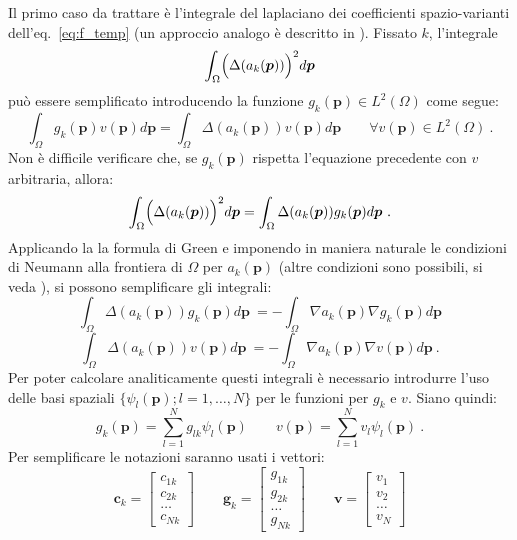 \documentclass[a4paper,11pt,twoside,openright]{book}							%
\begin{document}
Il primo caso da trattare è l'integrale del laplaciano dei coefficienti spazio-varianti dell'eq.~\eqref{eq:f_temp} (un approccio analogo è descritto in \cite{art:sangalli}). Fissato $k$, l'integrale
\begin{equation}
\int_{\Omega} \Bigl( \Delta(  a_k(\bm p)  ) \Bigr)^2 d \bm p
\label{eq:formadoppia}
\end{equation}
può essere semplificato introducendo la funzione $g_k(\bm p) \in L^2(\Omega)$ come segue:
\begin{equation}
\label{eq:ps1}
\int_\Omega g_k(\bm{p}) v(\bm{p}) d \bm{p}= \int_\Omega \Delta (a_k(\bm p)) v(\bm p) d \bm{p}\qquad \forall v(\bm{p}) \in L^2(\Omega) \ .
\end{equation}
Non è difficile verificare che, se $g_k(\bm p)$ rispetta l'equazione precedente con $v$ arbitraria, allora:
\begin{equation}
\label{eq:ps2}
\int_{\Omega} \Bigl( \Delta(  a_k(\bm p)  ) \Bigr)^2 d \bm p = \int_{\Omega}  \Delta(  a_k(\bm p))g_k(\bm p)d \bm p \ .
\end{equation}
Applicando la la formula di Green e imponendo in maniera naturale le condizioni di Neumann alla frontiera di $\Omega$ per $a_k(\bm p)$ (altre condizioni sono possibili, si veda \cite{art:sangalli}), si possono semplificare gli integrali:
\begin{equation}
\int_{\Omega}  \Delta(  a_k(\bm p))g_k(\bm p)d \bm p \ = -\int_{\Omega} \nabla  a_k(\bm p)\nabla g_k(\bm p)d \bm p
\label{eq:formasing1}
\end{equation}
\begin{equation}
\int_{\Omega}  \Delta(  a_k(\bm p))v(\bm p)d \bm p \ = -\int_{\Omega} \nabla  a_k(\bm p)\nabla v(\bm p)d \bm p \ .
\label{eq:formasing2}
\end{equation}
Per poter calcolare analiticamente questi integrali è necessario introdurre l'uso delle basi spaziali $\{ \psi_l(\bm p);l=1, \ldots , N \}$ per le funzioni per $g_k$ e $v$. Siano quindi:
$$
g_k(\bm p)=\sum_{l=1}^N g_{lk}\psi_l(\bm p) \qquad
v(\bm p)=\sum_{l=1}^N v_{l}\psi_l(\bm p) \ .
$$
Per semplificare le notazioni saranno usati i vettori:
$$
\bm c_k =
\begin{bmatrix}
c_{1k} \\ c_{2k} \\ \hdots \\ c_{Nk}
\end{bmatrix}
\qquad
\bm g_k =
\begin{bmatrix}
g_{1k} \\ g_{2k} \\ \hdots \\ g_{Nk}
\end{bmatrix}
\qquad
\bm v =
\begin{bmatrix}
v_1 \\ v_2 \\ \hdots \\ v_N
\end{bmatrix} 
$$
\end{document}

